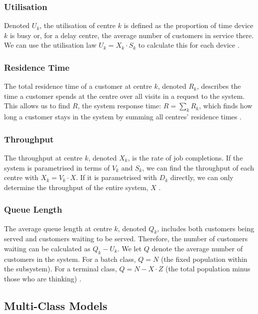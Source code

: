\subsubsection*{Utilisation}

Denoted $U_k$, the utilisation of centre $k$ is defined as the proportion of time device $k$ is busy or, for a delay centre, the average number of customers in service there. We can use the utilisation law $U_k = X_k \cdot S_k$ to calculate this for each device \cite{lazowska84}.

\subsubsection*{Residence Time}

The total residence time of a customer at centre $k$, denoted $R_k$, describes the time a customer spends at the centre over all visits in a request to the system. This allows us to find $R$, the system response time: $R = \sum_k R_k$, which finds how long a customer stays in the system by summing all centres' residence times \cite{lazowska84}.

\subsubsection*{Throughput}

The throughput at centre $k$, denoted $X_k$, is the rate of job completions. If the system is parametrised in terms of $V_k$ and $S_k$, we can find the throughput of each centre with $X_k = V_k \cdot X$. If it is parametrised with $D_k$ directly, we can only determine the throughput of the entire system, $X$ \cite{lazowska84}.

\subsubsection*{Queue Length}

The average queue length at centre $k$, denoted $Q_k$, includes both customers being served and customers waiting to be served. Therefore, the number of customers waiting can be calculated as $Q_k - U_k$. We let $Q$ denote the average number of customers in the system. For a batch class, $Q = N$ (the fixed population within the subsystem). For a terminal class, $Q = N - X \cdot Z$ (the total population minus those who are thinking) \cite{lazowska84}.

\subsection{Multi-Class Models}
\label{sec:bg-multiclass}

